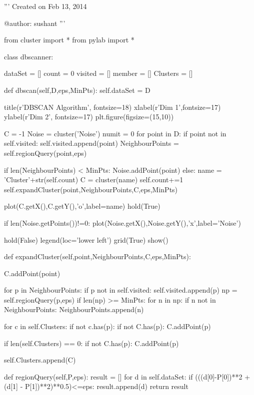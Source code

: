 \documentclass[a4paper, 12pt]{article}
\begin{document}
\newpage
\begin{python}[caption=DBSCAN]\label{App:DBSCAN}
'''
Created on Feb 13, 2014

@author: sushant
'''

from cluster import *
from pylab import *

class dbscanner:
    
	dataSet = []
	count = 0
	visited = []
	member = []
	Clusters = []
    
	def dbscan(self,D,eps,MinPts):
		self.dataSet = D
        
		title(r'DBSCAN Algorithm', fontsize=18)
		xlabel(r'Dim 1',fontsize=17)
		ylabel(r'Dim 2', fontsize=17)
		plt.figure(figsize=(15,10))
        
		C = -1
		Noise = cluster('Noise')
		numit = 0
		for point in D:
			if point not in self.visited:
				self.visited.append(point)
				NeighbourPoints = self.regionQuery(point,eps)
                
				if len(NeighbourPoints) < MinPts:
					Noise.addPoint(point)
				else:
					name = 'Cluster'+str(self.count)
					C = cluster(name)
					self.count+=1
					self.expandCluster(point,NeighbourPoints,C,eps,MinPts)
                    
					plot(C.getX(),C.getY(),'o',label=name)
					hold(True)

       
		if len(Noise.getPoints())!=0:
			plot(Noise.getX(),Noise.getY(),'x',label='Noise')
            
		hold(False)
		legend(loc='lower left')
		grid(True)
		show()
    
	def expandCluster(self,point,NeighbourPoints,C,eps,MinPts):
        
		C.addPoint(point)
        
		for p in NeighbourPoints:
			if p not in self.visited:
				self.visited.append(p)
				np = self.regionQuery(p,eps)
				if len(np) >= MinPts:
					for n in np:
						if n not in NeighbourPoints:
							NeighbourPoints.append(n)
                    
			for c in self.Clusters:
				if not c.has(p):
					if not C.has(p):
						C.addPoint(p)
                        
			if len(self.Clusters) == 0:
				if not C.has(p):
					C.addPoint(p)
                        
		self.Clusters.append(C)                 
                
                     
	def regionQuery(self,P,eps):
		result = []
		for d in self.dataSet:
			if (((d[0]-P[0])**2 + (d[1] - P[1])**2)**0.5)<=eps:
				result.append(d)
		return result            
    
\end{python}
\newpage
\end{document}
